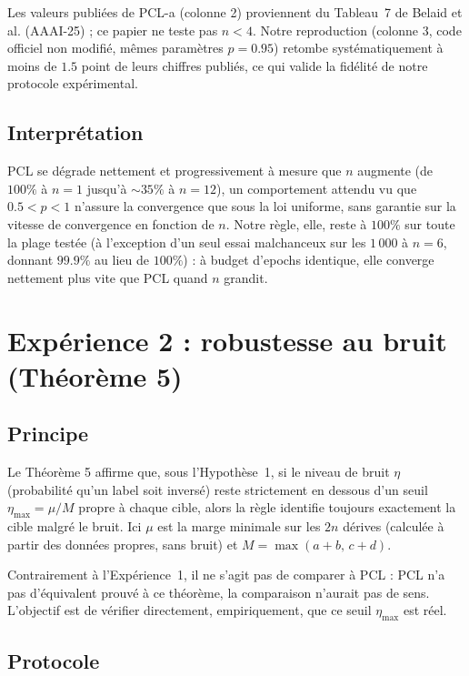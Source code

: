 \documentclass[11pt]{article}
\begin{document}
Les valeurs publiées de PCL-a (colonne 2) proviennent du Tableau~7 de
Belaid et al. (AAAI-25) ; ce papier ne teste pas $n<4$. Notre
reproduction (colonne 3, code officiel non modifié, mêmes paramètres
$p=0.95$) retombe systématiquement à moins de $1.5$ point de leurs
chiffres publiés, ce qui valide la fidélité de notre protocole
expérimental.

\subsection{Interprétation}

PCL se dégrade nettement et progressivement à mesure que $n$
augmente (de $100\%$ à $n=1$ jusqu'à $\sim35\%$ à $n=12$), un
comportement attendu vu que $0.5<p<1$ n'assure la convergence que sous
la loi uniforme, sans garantie sur la vitesse de convergence en
fonction de $n$. Notre règle, elle, reste à $100\%$ sur toute la
plage testée (à l'exception d'un seul essai malchanceux sur les $1\,000$
à $n=6$, donnant $99.9\%$ au lieu de $100\%$) : à budget d'epochs
identique, elle converge nettement plus vite que PCL quand $n$
grandit.

\section{Expérience 2 : robustesse au bruit (Théorème 5)}

\subsection{Principe}

Le Théorème 5 affirme que, sous l'Hypothèse~1, si le niveau de bruit
$\eta$ (probabilité qu'un label soit inversé) reste strictement en
dessous d'un seuil $\eta_{\max}=\mu/M$ propre à chaque cible, alors la
règle identifie toujours exactement la cible malgré le bruit. Ici $\mu$
est la marge minimale sur les $2n$ dérives (calculée à partir des
données propres, sans bruit) et $M=\max(a+b,\,c+d)$.

Contrairement à l'Expérience~1, il ne s'agit pas de comparer à PCL :
PCL n'a pas d'équivalent prouvé à ce théorème, la comparaison n'aurait
pas de sens. L'objectif est de vérifier directement, empiriquement, que
ce seuil $\eta_{\max}$ est réel.

\subsection{Protocole}
\end{document}
